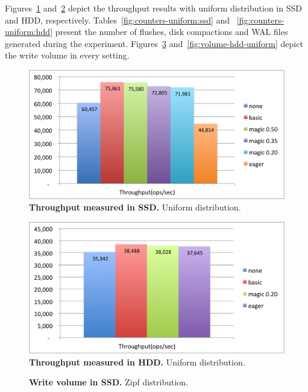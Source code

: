 {Figures~\ref{fig:throughput-ssd-uniform} and~\ref{fig:throughput-hdd-uniform} depict the throughput results with uniform distribution in SSD and HDD, respectively.
Tables~\ref{fig:counters-uniform:ssd} and ~\ref{fig:counters-uniform:hdd} present the number of flushes, disk compactions and WAL files generated during the experiment.
Figures~\ref{fig:volume-ssd-uniform} and~\ref{fig:volume-hdd-uniform} depict the write volume in every setting. 


\begin{figure}[htb]
\includegraphics[width=\figw]{Figs/throughput-ssd-uniform.png}
\caption{{\bf  Throughput measured in SSD.} Uniform distribution.
}
\label{fig:throughput-ssd-uniform}
\end{figure}

\begin{figure}[htb]
\includegraphics[width=\figw]{Figs/throughput-hdd-uniform.png}
\caption{{\bf  Throughput measured in HDD.} Uniform distribution. 
}
\label{fig:throughput-hdd-uniform}
\end{figure}

\begin{figure}[htb]
\caption{{\bf  Write volume in SSD.} Zipf distribution.
}
\label{fig:volume-ssd-uniform}
\end{figure}

}
